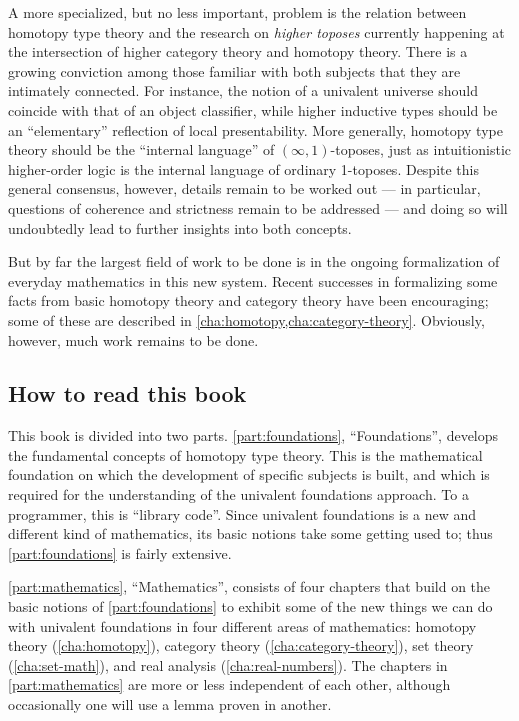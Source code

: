 A more specialized, but no less important, problem is the relation between homotopy type theory and the research on \emph{higher toposes}%
currently happening at the intersection of higher category theory and homotopy theory.
There is a growing conviction among those familiar with both subjects that they are intimately connected.
For instance, the notion of a univalent universe should coincide with that of an object classifier, while higher inductive types should be an ``elementary'' reflection of local presentability.
More generally, homotopy type theory should be the ``internal language'' of $(\infty,1)$-toposes, just as intuitionistic higher-order logic is the internal language of ordinary 1-toposes.
Despite this general consensus, however, details remain to be worked out --- in particular, questions of coherence and strictness remain to be addressed  --- and doing so will undoubtedly lead to further insights into both concepts.

But by far the largest field of work to be done is in the ongoing formalization of everyday mathematics in this new system.
Recent successes in formalizing some facts from basic homotopy theory and category theory have been encouraging; some of these are described in \cref{cha:homotopy,cha:category-theory}.
Obviously, however, much work remains to be done.


\subsection*{How to read this book}

This book is divided into two parts.
\autoref{part:foundations}, ``Foundations'', develops the fundamental concepts of homotopy type theory.
This is the mathematical foundation on which the development of specific subjects is built, and which is required for the understanding of the univalent foundations approach. To a programmer, this is ``library code''.
Since univalent foundations is a new and different kind of mathematics, its basic notions take some getting used to; thus \autoref{part:foundations} is fairly extensive.

\autoref{part:mathematics}, ``Mathematics'', consists of four chapters that build on the basic notions of \autoref{part:foundations} to exhibit some of the new things we can do with univalent foundations in four different areas of mathematics: homotopy theory (\autoref{cha:homotopy}), category theory (\autoref{cha:category-theory}), set theory (\autoref{cha:set-math}), and real analysis (\autoref{cha:real-numbers}).
The chapters in \autoref{part:mathematics} are more or less independent of each other, although occasionally one will use a lemma proven in another.

